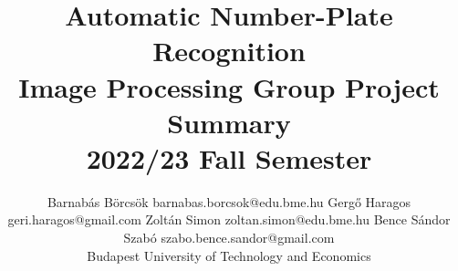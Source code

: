 \documentclass[twoside,11pt]{article}
\begin{document}
\title{
    Automatic Number-Plate Recognition\\
    Image Processing Group Project Summary\\
    2022/23 Fall Semester
}

\author{\name Barnabás Börcsök
    \email barnabas.borcsok@edu.bme.hu
    \AND
    \name Gergő Haragos
    \email geri.haragos@gmail.com
   \AND
    \name Zoltán Simon
    \email zoltan.simon@edu.bme.hu
   \AND
    \name Bence Sándor Szabó 
    \email szabo.bence.sandor@gmail.com
   \\\vfill\hfill\addr Budapest University of Technology and Economics
}

\maketitle










\newpage

\newpage
\end{document}
